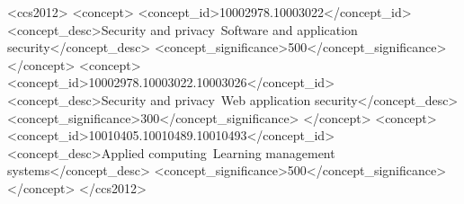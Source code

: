 \documentclass[sigconf, anonymous, review]{acmart}
\begin{document}
\begin{abstract}
    
    abstract

\end{abstract}

\begin{CCSXML}
<ccs2012>
   <concept>
       <concept_id>10002978.10003022</concept_id>
       <concept_desc>Security and privacy~Software and application security</concept_desc>
       <concept_significance>500</concept_significance>
       </concept>
   <concept>
       <concept_id>10002978.10003022.10003026</concept_id>
       <concept_desc>Security and privacy~Web application security</concept_desc>
       <concept_significance>300</concept_significance>
       </concept>
   <concept>
       <concept_id>10010405.10010489.10010493</concept_id>
       <concept_desc>Applied computing~Learning management systems</concept_desc>
       <concept_significance>500</concept_significance>
       </concept>
 </ccs2012>
\end{CCSXML}




\maketitle
\end{document}

